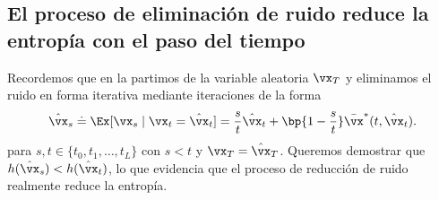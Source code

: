 \documentclass[../../book-main_es.tex]{subfiles}
\begin{document}
\subsection{El proceso de eliminación de ruido reduce la entropía con el
paso del tiempo}\label{sub:denoising_entropy_decreases}

Recordemos que en la  partimos de la
variable aleatoria \(\vx_{T}\) y eliminamos el ruido en forma iterativa mediante
iteraciones de la forma
\begin{equation}\label{eq:app_denoising_iteration}
    \hat{\vx}_{s} \doteq \Ex[\vx_{s} \mid \vx_{t} = \hat{\vx}_{t}] =
    \frac{s}{t}\hat{\vx}_{t} + \bp{1 -
    \frac{s}{t}}\bar{\vx}^{\ast}(t, \hat{\vx}_{t}).
\end{equation}
para \(s, t \in \{t_{0}, t_{1}, \dots, t_{L}\}\) con \(s < t\) y
\(\vx_{T} = \hat{\vx}_{T}\). Queremos demostrar que \(h(\hat{\vx}_{s})
< h(\hat{\vx}_{t})\), lo que evidencia que el proceso de reducción de ruido realmente
reduce la entropía.
\end{document}
